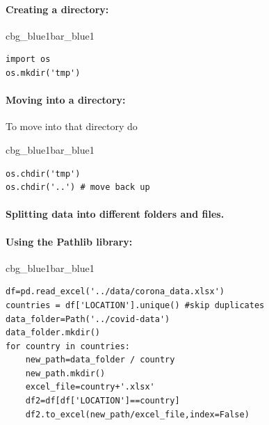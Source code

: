 \documentclass[%
oneside,                 %
final,                   %
10pt]{article}
\newenvironment{_pro_tight}[2]{
   \def\FrameCommand{\color{#2}\vrule width 1mm\normalcolor\colorbox{#1}}
   \FrameRule0.6pt\MakeFramed {\advance\hsize-2mm\FrameRestore}\vskip3mm}
   {\vskip0mm\endMakeFramed}
\newenvironment{pro}[2]{
\bgroup\rmfamily
\fboxsep=0mm\relax
\begin{_pro_tight}{#1}{#2}
\list{}{\parsep=-2mm\parskip=0mm\topsep=0pt\leftmargin=2mm
\rightmargin=2\leftmargin\leftmargin=4pt\relax}
\item\relax}
{\endlist\end{_pro_tight}\egroup}
\begin{document}
\paragraph{Creating a directory:}



\begin{pro}{cbg_blue1}{bar_blue1}\begin{Verbatim}[numbers=none,fontsize=\fontsize{9pt}{9pt},baselinestretch=0.95,xleftmargin=2mm]
import os
os.mkdir('tmp')

\end{Verbatim}
\end{pro}
\noindent

\paragraph{Moving into a directory:}
To move into that directory do



\begin{pro}{cbg_blue1}{bar_blue1}\begin{Verbatim}[numbers=none,fontsize=\fontsize{9pt}{9pt},baselinestretch=0.95,xleftmargin=2mm]
os.chdir('tmp')
os.chdir('..') # move back up

\end{Verbatim}
\end{pro}
\noindent


\paragraph{Splitting data into different folders and files.}
\paragraph{Using the Pathlib library:}












\begin{pro}{cbg_blue1}{bar_blue1}\begin{Verbatim}[numbers=none,fontsize=\fontsize{9pt}{9pt},baselinestretch=0.95,xleftmargin=2mm]
df=pd.read_excel('../data/corona_data.xlsx')
countries = df['LOCATION'].unique() #skip duplicates
data_folder=Path('../covid-data')
data_folder.mkdir()
for country in countries:
    new_path=data_folder / country
    new_path.mkdir()
    excel_file=country+'.xlsx'
    df2=df[df['LOCATION']==country]
    df2.to_excel(new_path/excel_file,index=False)

\end{Verbatim}
\end{pro}
\noindent
\end{document}
